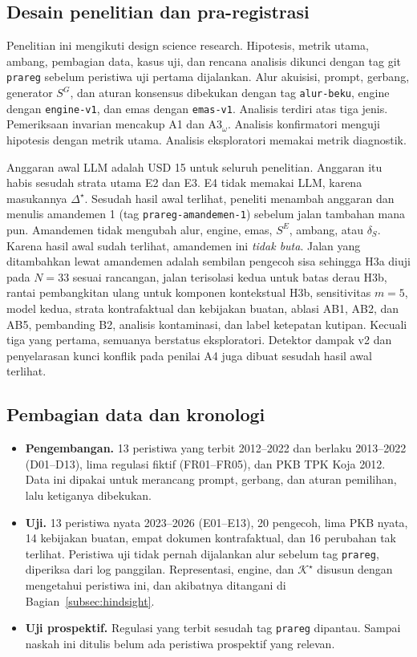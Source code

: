 \documentclass[journal,a4paper]{IEEEtran}
\makeatletter
\DeclareRobustCommand{\en}[1]{{\usefont{\f@encoding}{\f@family}{\f@series}{it}#1\/}}
\newcommand{\K}{\mathcal{K}}
\newcommand{\emas}{\star}
\newcommand{\SG}{S^{G}}
\newcommand{\SE}{S^{E}}
\makeatother
\begin{document}
\subsection{Desain penelitian dan pra-registrasi}
Penelitian ini mengikuti \en{design science research}. Hipotesis, metrik utama, ambang, pembagian data, kasus uji, dan rencana analisis dikunci dengan \en{tag} git \texttt{prareg} sebelum peristiwa uji pertama dijalankan. Alur akuisisi, \en{prompt}, gerbang, generator $\SG$, dan aturan konsensus dibekukan dengan \en{tag} \texttt{alur-beku}, \en{engine} dengan \texttt{engine-v1}, dan emas dengan \texttt{emas-v1}. Analisis terdiri atas tiga jenis. Pemeriksaan invarian mencakup A1 dan A3$_\omega$. Analisis konfirmatori menguji hipotesis dengan metrik utama. Analisis eksploratori memakai metrik diagnostik.

Anggaran awal LLM adalah USD 15 untuk seluruh penelitian. Anggaran itu habis sesudah strata utama E2 dan E3. E4 tidak memakai LLM, karena masukannya $\Delta^{\emas}$. Sesudah hasil awal terlihat, peneliti menambah anggaran dan menulis amandemen 1 (\en{tag} \texttt{prareg-amandemen-1}) sebelum jalan tambahan mana pun. Amandemen tidak mengubah alur, \en{engine}, emas, $\SE$, ambang, atau $\delta_S$. Karena hasil awal sudah terlihat, amandemen ini \emph{tidak buta}. Jalan yang ditambahkan lewat amandemen adalah sembilan pengecoh sisa sehingga H3a diuji pada $N = 33$ sesuai rancangan, jalan terisolasi kedua untuk batas derau H3b, rantai pembangkitan ulang untuk komponen kontekstual H3b, sensitivitas $m = 5$, model kedua, strata kontrafaktual dan kebijakan buatan, ablasi AB1, AB2, dan AB5, pembanding B2, analisis kontaminasi, dan label ketepatan kutipan. Kecuali tiga yang pertama, semuanya berstatus eksploratori. Detektor dampak v2 dan penyelarasan kunci konflik pada penilai A4 juga dibuat sesudah hasil awal terlihat.

\subsection{Pembagian data dan kronologi}
\label{subsec:pembagian}
\begin{itemize}[leftmargin=*,nosep]
  \item \textbf{Pengembangan.} 13 peristiwa yang terbit 2012--2022 dan berlaku 2013--2022 (D01--D13), lima regulasi fiktif (FR01--FR05), dan PKB TPK Koja 2012. Data ini dipakai untuk merancang \en{prompt}, gerbang, dan aturan pemilihan, lalu ketiganya dibekukan.
  \item \textbf{Uji.} 13 peristiwa nyata 2023--2026 (E01--E13), 20 pengecoh, lima PKB nyata, 14 kebijakan buatan, empat dokumen kontrafaktual, dan 16 perubahan tak terlihat. Peristiwa uji tidak pernah dijalankan alur sebelum \en{tag} \texttt{prareg}, diperiksa dari log panggilan. Representasi, \en{engine}, dan $\K^{\emas}$ disusun dengan mengetahui peristiwa ini, dan akibatnya ditangani di Bagian~\ref{subsec:hindsight}.
  \item \textbf{Uji prospektif.} Regulasi yang terbit sesudah \en{tag} \texttt{prareg} dipantau. Sampai naskah ini ditulis belum ada peristiwa prospektif yang relevan.
\end{itemize}
\end{document}
